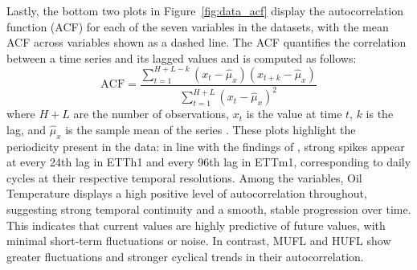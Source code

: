 \documentclass[a4paper,oneside,bibliography=totoc]{scrbook}
\begin{document}
Lastly, the bottom two plots in Figure~\ref{fig:data_acf} display the autocorrelation function (ACF) \cite{madsen_time_2007} for each of the seven variables in the datasets, with the mean ACF across variables shown as a dashed line. The ACF quantifies the correlation between a time series and its lagged values and is computed as follows:
\begin{equation}
    \text{ACF} = \frac{\sum_{t=1}^{H+L-k} (x_t - \hat{\mu}_x)(x_{t+k} - \hat{\mu}_x)}{\sum_{t=1}^{H+L} (x_t - \hat{\mu}_x)^2}
\end{equation}
where $H+L$ are the number of observations, $x_t$ is the value at time $t$, $k$ is the lag, and $\hat{\mu}_x$ is the sample mean of the series \cite{lin_cyclenet_2024}. These plots highlight the periodicity present in the data: in line with the findings of \citet{lin_cyclenet_2024}, strong spikes appear at every 24th lag in ETTh1 and every 96th lag in ETTm1, corresponding to daily cycles at their respective temporal resolutions.
Among the variables, Oil Temperature displays a high positive level of autocorrelation throughout, suggesting strong temporal continuity and a smooth, stable progression over time. This indicates that current values are highly predictive of future values, with minimal short-term fluctuations or noise.
In contrast, MUFL and HUFL show greater fluctuations and stronger cyclical trends in their autocorrelation.



\end{document}
